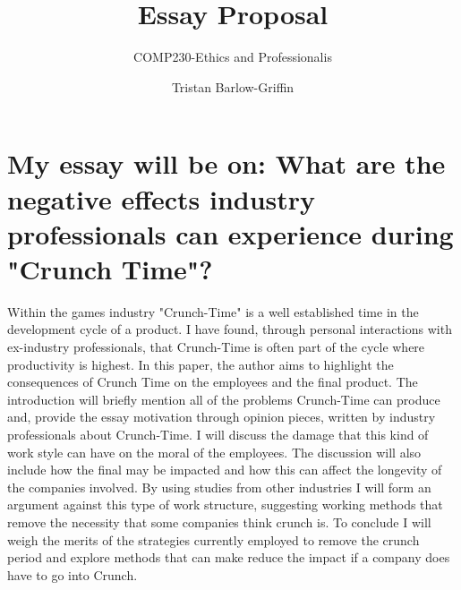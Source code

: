 \documentclass{scrartcl}
\title{Essay Proposal}
\subtitle{COMP230-Ethics and Professionalis}
\author{Tristan Barlow-Griffin}
\begin{document}
\maketitle

\section*{My essay will be on: What are the negative effects industry professionals can experience during "Crunch Time"?}

Within the games industry "Crunch-Time" is a well established time in the development cycle of a product. I have found, through personal interactions with ex-industry professionals, that Crunch-Time is often part of the cycle where productivity is highest. In this paper, the author aims to highlight the consequences of Crunch Time on the employees and the final product. The introduction will briefly mention all of the problems Crunch-Time can produce and, provide the essay motivation through opinion pieces, written by industry professionals about Crunch-Time. I will discuss the damage that this kind of work style can have on the moral of the employees. The discussion will also include how the final may be impacted and how this can affect the longevity of the companies involved. By using studies from other industries I will form an argument against this type of work structure, suggesting working methods that remove the necessity that some companies think crunch is. To conclude I will weigh the merits of the strategies currently employed to remove the crunch period and explore methods that can make reduce the impact if a company does have to go into Crunch.
\end{document}
